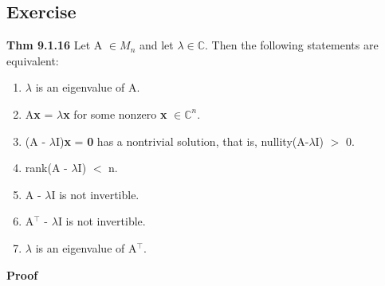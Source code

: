 \documentclass[12pt, letterpaper]{article}
\begin{document}
\subsection{Exercise}
\textbf{Thm 9.1.16} Let A $\in M_n$ and let $\lambda \in \mathbb{C}$. Then the following statements are equivalent:
\begin{enumerate}
    \item $\lambda$ is an eigenvalue of A.
    \item A\textbf{x} = $\lambda$\textbf{x} for some nonzero \textbf{x} $\in \mathbb{C}^n$.
    \item (A - $\lambda$I)\textbf{x} = \textbf{0} has a nontrivial solution, that is, nullity(A-$\lambda$I) $>$ 0.
    \item rank(A - $\lambda$I) $<$ n.
    \item A - $\lambda$I is not invertible.
    \item A$^\top$ - $\lambda$I is not invertible.
    \item $\lambda$ is an eigenvalue of A$^\top$.
\end{enumerate}
\textbf{Proof}
\end{document}
